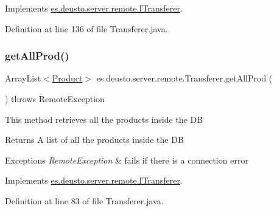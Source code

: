 Implements \hyperlink{interfacees_1_1deusto_1_1server_1_1remote_1_1_i_transferer_a86d92e8a78257551122807ae02259950}{es.\+deusto.\+server.\+remote.\+I\+Transferer}.



Definition at line 136 of file Transferer.\+java.

\mbox{\label{classes_1_1deusto_1_1server_1_1remote_1_1_transferer_a29cbb75edeb4e0973780fd379ef2b3fb}} 
\subsubsection{\texorpdfstring{get\+All\+Prod()}{getAllProd()}}
{\footnotesize\ttfamily Array\+List$<$\hyperlink{classes_1_1deusto_1_1server_1_1db_1_1data_1_1_product}{Product}$>$ es.\+deusto.\+server.\+remote.\+Transferer.\+get\+All\+Prod (\begin{DoxyParamCaption}{ }\end{DoxyParamCaption}) throws Remote\+Exception}

This method retrieves all the products inside the DB \begin{DoxyReturn}{Returns}
A list of all the products inside the DB 
\end{DoxyReturn}

\begin{DoxyExceptions}{Exceptions}
{\em Remote\+Exception} & fails if there is a connection error \\
\hline
\end{DoxyExceptions}


Implements \hyperlink{interfacees_1_1deusto_1_1server_1_1remote_1_1_i_transferer_a71afa6799122b3f09805f86d2e58fc23}{es.\+deusto.\+server.\+remote.\+I\+Transferer}.



Definition at line 83 of file Transferer.\+java.

\mbox{\label{classes_1_1deusto_1_1server_1_1remote_1_1_transferer_a613c0c3af149140e58488ce9d0745593}} 
